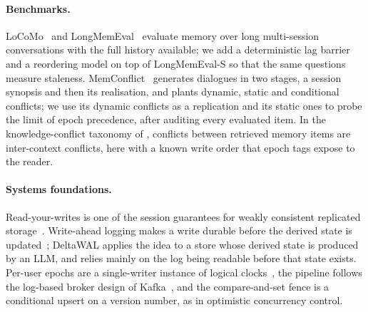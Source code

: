 \paragraph{Benchmarks.}
LoCoMo~\citep{maharana2024locomo} and LongMemEval~\citep{wu2025longmemeval} evaluate memory over long multi-session conversations with the full history available; we add a deterministic lag barrier and a reordering model on top of LongMemEval-S so that the same questions measure staleness. MemConflict~\citep{tao2026memconflict} generates dialogues in two stages, a session synopsis and then its realisation, and plants dynamic, static and conditional conflicts; we use its dynamic conflicts as a replication and its static ones to probe the limit of epoch precedence, after auditing every evaluated item. In the knowledge-conflict taxonomy of \citet{xu2024knowledge}, conflicts between retrieved memory items are inter-context conflicts, here with a known write order that epoch tags expose to the reader.

\paragraph{Systems foundations.}
Read-your-writes is one of the session guarantees for weakly consistent replicated storage~\citep{terry1994session}. Write-ahead logging makes a write durable before the derived state is updated~\citep{mohan1992aries}; DeltaWAL applies the idea to a store whose derived state is produced by an LLM, and relies mainly on the log being readable before that state exists. Per-user epochs are a single-writer instance of logical clocks~\citep{lamport1978time}, the pipeline follows the log-based broker design of Kafka~\citep{kreps2011kafka}, and the compare-and-set fence is a conditional upsert on a version number, as in optimistic concurrency control.

